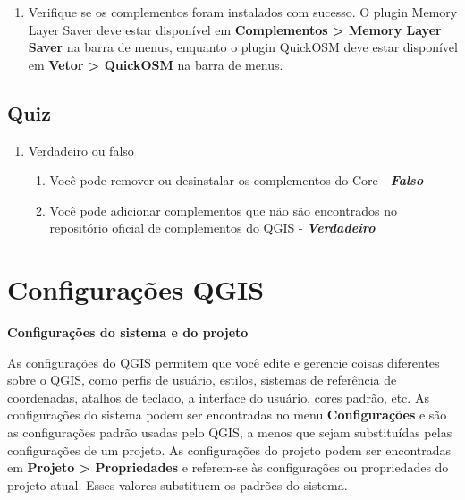\documentclass[
]{krantz}
\providecommand{\tightlist}{%
  \setlength{\itemsep}{0pt}\setlength{\parskip}{0pt}}
\begin{document}
\begin{enumerate}
\def\labelenumi{\arabic{enumi}.}
\setcounter{enumi}{2}
\tightlist
\item
  Verifique se os complementos foram instalados com sucesso. O plugin Memory Layer Saver deve estar disponível em \textbf{Complementos \textgreater{} Memory Layer Saver} na barra de menus, enquanto o plugin QuickOSM deve estar disponível em \textbf{Vetor \textgreater{} QuickOSM} na barra de menus.
\end{enumerate}

\hypertarget{quiz-4}{%
\subsection{Quiz}\label{quiz-4}}

\begin{enumerate}
\def\labelenumi{\arabic{enumi}.}
\tightlist
\item
  Verdadeiro ou falso

  \begin{enumerate}
  \def\labelenumii{\arabic{enumii}.}
  \tightlist
  \item
    Você pode remover ou desinstalar os complementos do Core - \textbf{\emph{Falso}}
  \item
    Você pode adicionar complementos que não são encontrados no repositório oficial de complementos do QGIS - \textbf{\emph{Verdadeiro}}
  \end{enumerate}
\end{enumerate}

\hypertarget{configurauxe7uxf5es-qgis}{%
\section{Configurações QGIS}\label{configurauxe7uxf5es-qgis}}

\textbf{Configurações do sistema e do projeto}

As configurações do QGIS permitem que você edite e gerencie coisas diferentes sobre o QGIS, como perfis de usuário, estilos, sistemas de referência de coordenadas, atalhos de teclado, a interface do usuário, cores padrão, etc. As configurações do sistema podem ser encontradas no menu \textbf{Configurações} e são as configurações padrão usadas pelo QGIS, a menos que sejam substituídas pelas configurações de um projeto. As configurações do projeto podem ser encontradas em \textbf{Projeto \textgreater{} Propriedades} e referem-se às configurações ou propriedades do projeto atual. Esses valores substituem os padrões do sistema.
\end{document}
